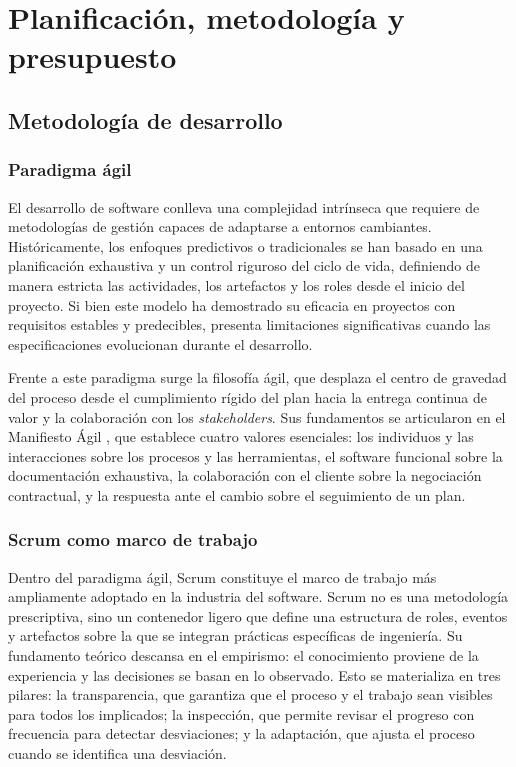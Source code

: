 \chapter{Planificación, metodología y presupuesto}

\section{Metodología de desarrollo}

\subsection{Paradigma ágil}

El desarrollo de software conlleva una complejidad intrínseca que requiere de metodologías de gestión capaces de adaptarse a entornos cambiantes. Históricamente, los enfoques predictivos o tradicionales se han basado en una planificación exhaustiva y un control riguroso del ciclo de vida, definiendo de manera estricta las actividades, los artefactos y los roles desde el inicio del proyecto. Si bien este modelo ha demostrado su eficacia en proyectos con requisitos estables y predecibles, presenta limitaciones significativas cuando las especificaciones evolucionan durante el desarrollo.

Frente a este paradigma surge la filosofía ágil, que desplaza el centro de gravedad del proceso desde el cumplimiento rígido del plan hacia la entrega continua de valor y la colaboración con los \textit{stakeholders}. Sus fundamentos se articularon en el Manifiesto Ágil \cite{canos2003metodologias}, que establece cuatro valores esenciales: los individuos y las interacciones sobre los procesos y las herramientas, el software funcional sobre la documentación exhaustiva, la colaboración con el cliente sobre la negociación contractual, y la respuesta ante el cambio sobre el seguimiento de un plan.

\subsection{Scrum como marco de trabajo}

Dentro del paradigma ágil, Scrum constituye el marco de trabajo más ampliamente adoptado en la industria del software. Scrum no es una metodología prescriptiva, sino un contenedor ligero que define una estructura de roles, eventos y artefactos sobre la que se integran prácticas específicas de ingeniería. Su fundamento teórico descansa en el empirismo: el conocimiento proviene de la experiencia y las decisiones se basan en lo observado. Esto se materializa en tres pilares: la transparencia, que garantiza que el proceso y el trabajo sean visibles para todos los implicados; la inspección, que permite revisar el progreso con frecuencia para detectar desviaciones; y la adaptación, que ajusta el proceso cuando se identifica una desviación.

